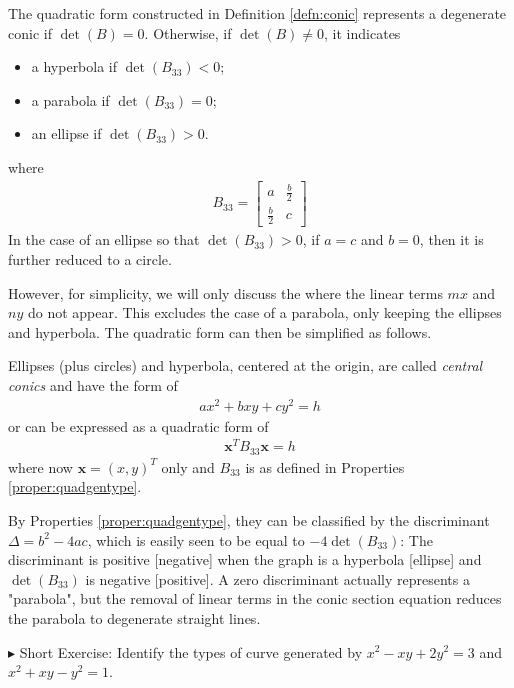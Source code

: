 \begin{proper}
\label{proper:quadgentype}
The quadratic form constructed in Definition \ref{defn:conic} represents a degenerate conic if $\det(B) = 0$. Otherwise, if $\det(B) \neq 0$, it indicates
\begin{itemize}
    \item a hyperbola if $\det(B_{33}) < 0$;
    \item a parabola if $\det(B_{33}) = 0$;
    \item an ellipse if $\det(B_{33}) > 0$.
\end{itemize}
where
\begin{align*}
B_{33} = 
\begin{bmatrix}
a & \frac{b}{2} \\
\frac{b}{2} & c 
\end{bmatrix}
\end{align*}
In the case of an ellipse so that $\det(B_{33}) > 0$, if $a = c$ and $b = 0$, then it is further reduced to a circle.
\end{proper}
However, for simplicity, we will only discuss the  where the linear terms $mx$ and $ny$ do not appear. This excludes the case of a parabola, only keeping the ellipses and hyperbola. The quadratic form can then be simplified as follows.
\begin{proper}
\label{proper:quadcentraltype}
Ellipses (plus circles) and hyperbola, centered at the origin, are called \textit{central conics} and have the form of
\begin{align}
ax^2 + bxy + cy^2 = h
\end{align}
or can be expressed as a quadratic form of
\begin{align}
\textbf{x}^T B_{33} \textbf{x} = h \label{eqn:xB33x}
\end{align}
where now $\textbf{x} = (x,y)^T$ only and $B_{33}$ is as defined in Properties \ref{proper:quadgentype}.
\end{proper}
By Properties \ref{proper:quadgentype}, they can be classified by the discriminant $\Delta = b^2 - 4ac$, which is easily seen to be equal to $-4\det(B_{33})$: The discriminant is positive [negative] when the graph is a hyperbola [ellipse] and $\det(B_{33})$ is negative [positive]. A zero discriminant actually represents a "parabola", but the removal of linear terms in the conic section equation reduces the parabola to degenerate straight lines. \par
$\blacktriangleright$ Short Exercise: Identify the types of curve generated by $x^2 - xy + 2y^2 = 3$ and $x^2 + xy - y^2 = 1$.\footnotemark\par
